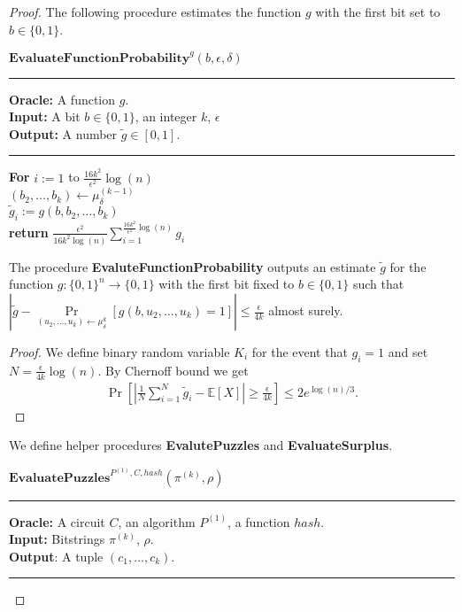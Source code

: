 \begin{proof}
%
  The following procedure estimates the function $g$ with the first bit set to $b \in \{0,1\}$.
%
\begin{codeblock}
  $\textbf{EvaluateFunctionProbability}^{g}(b, \epsilon, \delta)$
  \medskip
  \hrule
  \medskip
  \textbf{Oracle:} A function $g$.\\
  \textbf{Input:} A bit $b \in \{0,1\}$, an integer $k$, $\epsilon$ \\
  \textbf{Output:} A number $\widetilde{g} \in \left[0,1\right]$.
  \medskip\hrule\medskip
  \textbf{For} $i:=1$ to $\frac{16k^2}{\epsilon^2}\log(n)$ \Do \\
  \IndI $(b_2, \dots, b_k) \leftarrow \mu_{\delta}^{(k-1)}$ \\
  \IndI $\widetilde{g}_i := g(b,b_2, \dots, b_k)$ \then \\
  \textbf{return} $\frac{\epsilon^2}{16k^2\log(n)} \sum_{i=1}^{\frac{16k^2}{\epsilon^2}\log(n)} g_i$
\end{codeblock}
%
\begin{lemma}
  \label{lemma:estimate_of_g}
  The procedure \textbf{EvaluteFunctionProbability} outputs an estimate $\widetilde{g}$ for the function $g: \{0,1\}^{n} \rightarrow \{0,1\}$ with the first bit fixed to $b \in \{0,1\}$
  such that $| \widetilde{g} - \underset{(u_2,\dots,u_k) \leftarrow \mu_{\delta}^{k}}{\Pr}\left[g(b,u_2, \dots, u_k) = 1\right] | \leq \frac{\epsilon}{4k}$ almost surely.
\end{lemma}
%
\begin{proof}
We define binary random variable $K_i$ for the event that $g_i = 1$ and set $N = \frac{\epsilon}{4k}\log(n)$.
By Chernoff bound we get
\begin{align*}
  \underset{}{\Pr}\left[\left|\frac{1}{N} \sum_{i=1}^{N} \widetilde{g}_i - \mathbb{E}[X]\right| \geq \frac{\epsilon}{4k}  \right] \leq 2e^{\log(n)/3}.
\end{align*}
\end{proof}
%
We define helper procedures \textbf{EvalutePuzzles} and \textbf{EvaluateSurplus}.
%
\begin{codeblock}
  $\textbf{EvaluatePuzzles}^{P^{(1)}, C, hash}(\pi^{(k)}, \rho)$
  \medskip \hrule \medskip
  \textbf{Oracle:}  A circuit $C$, an algorithm $P^{(1)}$, a function $hash$.\\
  \textbf{Input:} Bitstrings $\pi^{(k)}$, $\rho$.\\
  \textbf{Output}: A tuple $(c_1, \dots, c_k)$.
  \medskip\hrule\medskip

\end{codeblock}
\end{proof}
